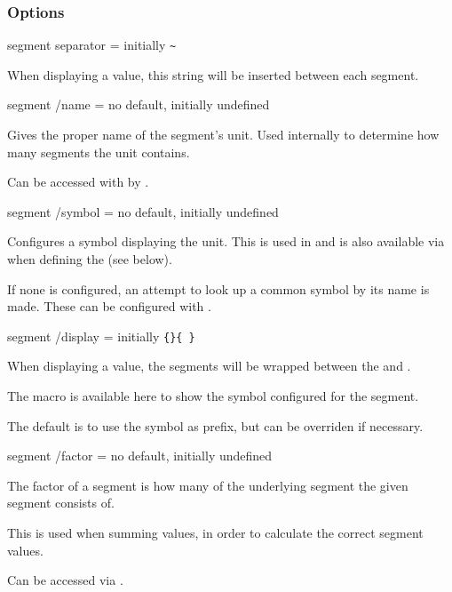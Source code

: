 \documentclass{article}
\begin{document}
\subsubsection{Options}

\begin{docKey}
	{segment separator}
	{=}
	{initially \texttt{\~{}}}
	
	When displaying a value, this string will be inserted between each segment.
\end{docKey}

\begin{docKey}
	[]
	[doc label=segment:name]
	{segment /name}
	{=}
	{no default, initially undefined}

	Gives the proper name of the segment's unit. Used internally to determine how many segments the unit contains.
	
	Can be accessed with by .
\end{docKey}

\begin{docKey}
	[]
	[doc label=segment:symbol]
	{segment /symbol}
	{=}
	{no default, initially undefined}

	Configures a symbol displaying the unit. This is used in  and is also available via  when defining the  (see below).
	
	If none is configured, an attempt to look up a common symbol by its name is made. These can be configured with .
\end{docKey}

\begin{docKey}
	[]
	[doc label=segment:display]
	{segment /display}
	{=}
	{initially \texttt{\{\}\{ \}}}

	When displaying a value, the segments will be wrapped between the  and .
	
	The macro  is available here to show the symbol configured for the segment.
	
	The default is to use the symbol as prefix, but can be overriden if necessary.
\end{docKey}

\begin{docKey}
	[]
	[doc label=segment:factor]
	{segment /factor}
	{=}
	{no default, initially undefined}
	
	The factor of a segment is how many of the underlying segment the given segment consists of.
	
	This is used when summing values, in order to calculate the correct segment values.
	
	Can be accessed via .
\end{docKey}
\end{document}
